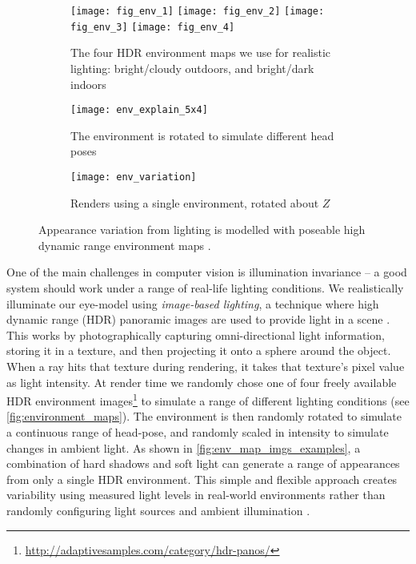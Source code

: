 \begin{figure}
    \begin{subfigure}[t]{\columnwidth}
        \texttt{[image: fig\_env\_1]} \hfill
    	\texttt{[image: fig\_env\_2]} \hfill
        \texttt{[image: fig\_env\_3]} \hfill
    	\texttt{[image: fig\_env\_4]}
	    \caption{The four HDR environment maps we use for realistic lighting: bright/cloudy outdoors, and bright/dark indoors}
    \end{subfigure}
    \par \medskip
    \begin{subfigure}[t]{0.48\columnwidth}
        \texttt{[image: env\_explain\_5x4]}
    	\caption{The environment is rotated to simulate different head poses}
    \end{subfigure}%
    \hfill
    \begin{subfigure}[t]{0.48\columnwidth}
        \texttt{[image: env\_variation]}
        \caption{Renders using a single environment, rotated about $Z$}
        \label{fig:env_map_imgs_examples}
    \end{subfigure}
    \caption{Appearance variation from lighting is modelled with poseable high dynamic range environment maps \cite{debevec2002image}.}
    \label{fig:environment_maps}
\end{figure}

One of the main challenges in computer vision is illumination invariance -- a good system should work under a range of real-life lighting conditions.
We realistically illuminate our eye-model using \emph{image-based lighting}, a technique where high dynamic range (HDR) panoramic images are used to provide light in a scene \cite{debevec2002image}.
This works by photographically capturing omni-directional light information, storing it in a texture, and then projecting it onto a sphere around the object.
When a ray hits that texture during rendering, it takes that texture's pixel value as light intensity.
At render time we randomly chose one of four freely available HDR environment images\footnote{\url{http://adaptivesamples.com/category/hdr-panos/}} to simulate a range of different lighting conditions (see \autoref{fig:environment_maps}).
The environment is then randomly rotated to simulate a continuous range of head-pose, and randomly scaled in intensity to simulate changes in ambient light.
As shown in \autoref{fig:env_map_imgs_examples}, a combination of hard shadows and soft light can generate a range of appearances from only a single HDR environment.
This simple and flexible approach creates variability using measured light levels in real-world environments rather than randomly configuring light sources and ambient illumination \cite{zface}.

